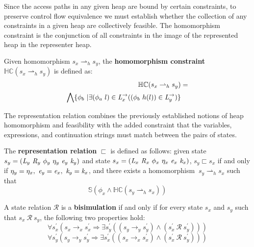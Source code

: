 Since the access paths in any given heap are bound by certain constraints, to preserve control flow equivalence we must establish whether the collection of any constraints in a given heap are collectively feasible. The homomorphism constraint is the conjunction of all constraints in the image of the represented heap in the representer heap.

\begin{definition}
\label{def:hc}
Given homomorphism $s_x \rightharpoonup_{h} s_y$, the \textbf{homomorphism constraint} $\mathbb{HC}(s_x \rightharpoonup_{h} s_y)$ is defined as:
\begin{align*}
\mathbb{HC}(s_x \rightharpoonup_{h} s_y) &= \\
 \bigwedge \{ \phi_b\ | \exists (\phi_a\ l) \in \emph{L}_x^\rightarrow ( (\phi_b\ h(l)) \in \emph{L}_y^\rightarrow)\} 
\end{align*}
\end{definition}

The representation relation combines the previously established notions of heap homomorphism and feasibility with the added constraint that the variables, expressions, and continuation strings must match between the pairs of states. 

\begin{definition}
\label{representation}
The \textbf{representation relation} $\sqsubset$ is defined as follows: given state $s_y = ( \emph{L}_y\ \emph{R}_y\ \phi_y\ \eta_y\ \emph{e}_y\ \emph{k}_y )$ and state $s_x = ( \cfgnt{L}_x\ \cfgnt{R}_x\ \phi_x\ \eta_x\ \cfgnt{e}_x\ \cfgnt{k}_x )$, $s_y \sqsubset s_x $ if and only if $\eta_y = \eta_x ,\ \emph{e}_y = \emph{e}_x ,\ \emph{k}_y = \emph{k}_x$, and there exists a homomorphism $\ s_y \rightharpoonup_{h} s_x $ such that 
\begin{equation}
\label{eqn:valid}
 \mathbb{S}( \phi_x \wedge \mathbb{HC}(s_y \rightharpoonup_{h} s_x) ) 
\end{equation}
\end{definition}

\begin{definition}
\label{bisimulation}
A state relation $\mathcal{R}$ is a \textbf{bisimulation} if and only if for every state $s_x$ and $s_y$ such that $s_x\ \mathcal{R}\ s_y$, the following two properties hold: 
\begin{equation}
\label{eqn:BisimulationForwards}
\forall s_x^\prime ( s_x \rightarrow_x s_x^\prime \Rightarrow \exists s_y^\prime( (s_y \rightarrow_y s_y^\prime )\wedge (s_x^\prime\ \mathcal{R}\ s_y^\prime ))  )
\end{equation}
\begin{equation}
\label{eqn:BisimulationBackwards}
\forall s_y^\prime ( s_y \rightarrow_y s_y^\prime\Rightarrow \exists s_x^\prime( (s_x \rightarrow_x s_x^\prime )\wedge (s_x^\prime\ \mathcal{R}\ s_y^\prime ))  )
\end{equation}
\end{definition}

